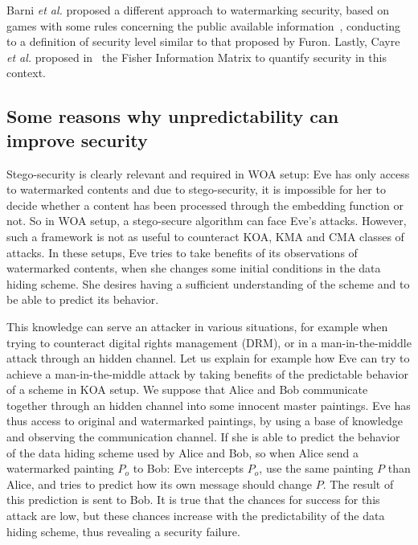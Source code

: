 \documentclass{llncs}
\begin{document}
Barni \emph{et al.} proposed a different approach to watermarking security, based on games with some rules concerning the public available information~\cite{BarniBF03}, conducting to a definition of security level similar to that proposed by Furon. Lastly, Cayre \emph{et al.} proposed in~\cite{Cayre2005} the Fisher Information Matrix to quantify security in this context.


\subsection{Some reasons why unpredictability can improve security}

Stego-security is clearly relevant and required in WOA setup: Eve has only access to watermarked contents and due to stego-security, it is impossible for her to decide whether a content has been processed through the embedding function or not. So in WOA setup, a stego-secure algorithm can face Eve's attacks. However, such a framework is not as useful to counteract KOA, KMA and CMA classes of attacks. In these setups, Eve tries to take benefits of its observations of watermarked contents, when she changes some  initial conditions in the data hiding scheme. She desires having a sufficient understanding of the scheme and to be able to predict its behavior.


This knowledge can serve an attacker in various situations, for example when trying to counteract digital rights management (DRM), or in a man-in-the-middle attack through an hidden channel. Let us explain for example how Eve can try to achieve a man-in-the-middle attack by taking benefits of the predictable behavior of a scheme in KOA setup. We suppose that Alice and Bob communicate together through an hidden channel into some innocent master paintings. Eve has thus access to original and watermarked paintings, by using a base of knowledge and observing the communication channel. If she is able to predict the behavior of the data hiding scheme used by Alice and Bob, so when Alice send a watermarked painting $P_o$ to Bob: Eve intercepts $P_o$, use the same painting $P$ than Alice, and tries to predict how its own message should change $P$. The result of this prediction is sent to Bob. It is true that the chances for success for this attack are low, but these chances increase with the predictability of the data hiding scheme, thus revealing a security failure.
\end{document}
